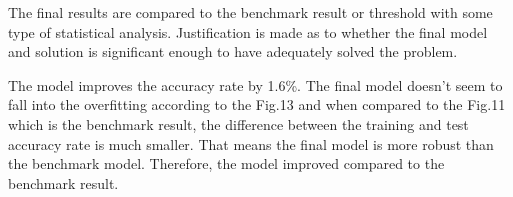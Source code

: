 The final results are compared to the benchmark result or threshold with some type of statistical analysis. Justification is made as to whether the final model and solution is significant enough to have adequately solved the problem.

The model improves the accuracy rate by 1.6\%. The final model doesn't seem to fall into the overfitting according to the Fig.13 and when compared to the Fig.11 which is the benchmark result, the difference between the training and test accuracy rate is much smaller. That means the final model is more robust than the benchmark model. Therefore, the model improved compared to the benchmark result.




